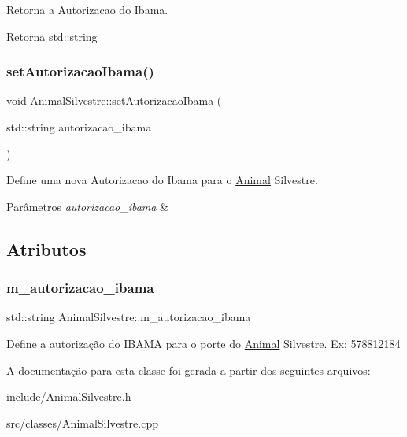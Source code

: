 Retorna a Autorizacao do Ibama. 

\begin{DoxyReturn}{Retorna}
std\+::string 
\end{DoxyReturn}
\mbox{\label{classAnimalSilvestre_ae7c8a7c193ff93fafe05419ff1c5db18}} 
\subsubsection{\texorpdfstring{set\+Autorizacao\+Ibama()}{setAutorizacaoIbama()}}
{\footnotesize\ttfamily void Animal\+Silvestre\+::set\+Autorizacao\+Ibama (\begin{DoxyParamCaption}\item[{std\+::string}]{autorizacao\+\_\+ibama }\end{DoxyParamCaption})}



Define uma nova Autorizacao do Ibama para o \hyperlink{classAnimal}{Animal} Silvestre. 


\begin{DoxyParams}{Parâmetros}
{\em autorizacao\+\_\+ibama} & \\
\hline
\end{DoxyParams}


\subsection{Atributos}
\mbox{\label{classAnimalSilvestre_a921c430fa2507062e3a2605599dd6735}} 
\subsubsection{\texorpdfstring{m\+\_\+autorizacao\+\_\+ibama}{m\_autorizacao\_ibama}}
{\footnotesize\ttfamily std\+::string Animal\+Silvestre\+::m\+\_\+autorizacao\+\_\+ibama\hspace{0.3cm}{\ttfamily [protected]}}

Define a autorização do I\+B\+A\+MA para o porte do \hyperlink{classAnimal}{Animal} Silvestre. Ex\+: 578812184 

A documentação para esta classe foi gerada a partir dos seguintes arquivos\+:\begin{DoxyCompactItemize}
\item 
include/Animal\+Silvestre.\+h\item 
src/classes/Animal\+Silvestre.\+cpp\end{DoxyCompactItemize}
